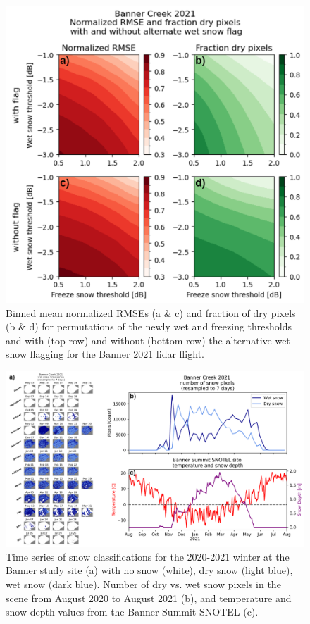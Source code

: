 \documentclass[journal abbreviation, manuscript]{copernicus}
\begin{document}
\begin{figure}
    \centering
    \includegraphics[width=\textwidth]{figA4.png}
    \caption{Binned mean normalized RMSEs (a \& c) and fraction of dry pixels (b \& d) for permutations of the newly wet and freezing thresholds and with (top row) and without (bottom row) the alternative wet snow flagging for the Banner 2021 lidar flight.}
    \label{fig:wet_snow_params}
\end{figure}



\begin{figure}
    \centering
    \includegraphics[width=16cm]{figA5.png}
    \caption{Time series of snow classifications for the 2020-2021 winter at the Banner study site (a) with no snow (white), dry snow (light blue), wet snow (dark blue). Number of dry vs. wet snow pixels in the scene from August 2020 to August 2021 (b), and temperature and snow depth values from the Banner Summit SNOTEL (c).}
    \label{fig:banner_wet_snow}
\end{figure}
%
\end{document}
